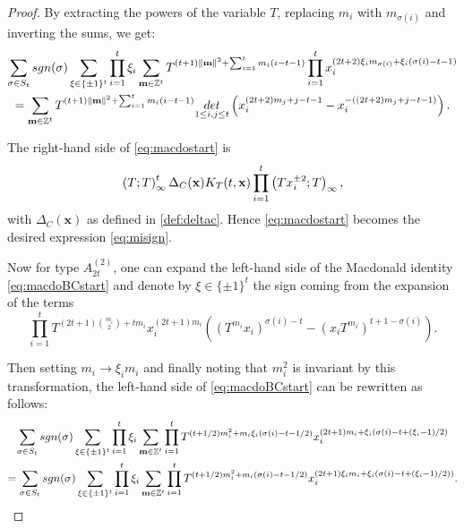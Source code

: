 \documentclass[11pt,letterpaper]{amsart}
\def\bbbz{\mathbb Z}
\def\det{{\rm det}}
\def\sgn{{\rm sgn}}
\numberwithin{equation}{section}
\numberwithin{df}{section}
\begin{document}
\begin{proof}
\noindent By extracting the powers of the variable $T$, replacing $m_i$ with $m_{\sigma(i)}$ and inverting the sums, we get:
\begin{multline*}
\sum_{\sigma\in S_t}\sgn(\sigma) \sum_{\xi\in\lbrace \pm 1\rbrace^t}\prod_{i=1}^t \xi_i\sum_{\mathbf{m}\in\bbbz^t}T^{(t+1)\lVert \mathbf{m}\rVert^2+\sum_{i=1}^t m_i(i-t-1)}\prod_{i=1}^t   x_i^{(2t+2)\xi_im_{\sigma(i)}+\xi_i(\sigma(i)-t-1)}\\
=\sum_{\mathbf{m}\in\bbbz^t}T^{(t+1)\lVert \mathbf{m}\rVert^2+\sum_{i=1}^tm_i(i-t-1)}\underset{1\le i,j\le t}{\det}\left(x_i^{(2t+2)m_j+j-t-1}-x_i^{-((2t+2)m_j+j-t-1)}\right).
\end{multline*}


\noindent The right-hand side of \eqref{eq:macdostart} is
\begin{equation*}
\left(T;T\right)_\infty^t \Delta_C(\mathbf{x})K_T(t,{\bf x})\prod_{i=1}^t \left(Tx_i^{\pm 2};T\right)_\infty,
\end{equation*}
%
with $\Delta_C(\mathbf{x})$ as defined in \eqref{def:deltac}.
Hence \eqref{eq:macdostart} becomes the desired expression \eqref{eq:misign}.
%

Now for type $A_{2t}^{(2)}$, one can expand the left-hand side of the Macdonald identity \eqref{eq:macdoBCstart} and denote by $\xi\in\lbrace \pm 1\rbrace^t$ the sign coming from the expansion of the terms $$\prod_{i=1}^t T^{(2t+1)\binom{m_i}{2}+t m_i}x_i^{(2t+1)m_i}\left((T^{m_i}x_i)^{\sigma(i)-t}-(x_iT^{m_i})^{t+1-\sigma(i)}\right).$$

\noindent Then setting $m_i\to \xi_i m_i$ and finally noting that $m_i^2$ is invariant by this transformation, the left-hand side of \eqref{eq:macdoBCstart} can be rewritten as follows:
\begin{multline*}
\sum_{\sigma\in S_t}\sgn(\sigma) \sum_{\xi\in\lbrace \pm 1\rbrace^t}\prod_{i=1}^t \xi_i \sum_{\mathbf{m}\in\bbbz^t}\prod_{i=1}^t T^{(t+1/2)m_i^2+m_i \xi_i(\sigma(i)-t-1/2)} x_i^{(2t+1)m_i+\xi_i(\sigma(i)-t+(\xi_i-1)/2)}\\
=\sum_{\sigma\in S_t}\sgn(\sigma) \sum_{\xi\in\lbrace \pm 1\rbrace^t}\prod_{i=1}^t \xi_i\sum_{\mathbf{m}\in\bbbz^t}\prod_{i=1}^t  T^{(t+1/2)m_i^2+m_i(\sigma(i)-t-1/2)} x_i^{(2t+1)\xi_im_i+\xi_i(\sigma(i)-t+(\xi_i-1)/2))}.
\end{multline*}





\end{proof}
\end{document}
